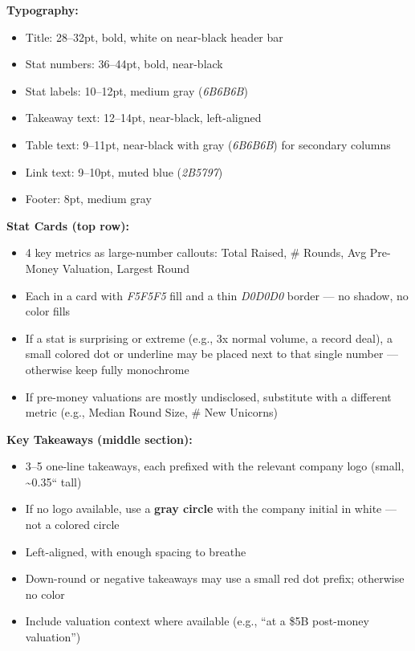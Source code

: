 \documentclass[11pt]{article}
\begin{document}
\textbf{Typography:}

\begin{itemize}[leftmargin=*,itemsep=2pt,topsep=2pt]
\item {} Title: 28–32pt, bold, white on near-black header bar
\item {} Stat numbers: 36–44pt, bold, near-black
\item {} Stat labels: 10–12pt, medium gray (\emph{6B6B6B})
\item {} Takeaway text: 12–14pt, near-black, left-aligned
\item {} Table text: 9–11pt, near-black with gray (\emph{6B6B6B}) for secondary columns
\item {} Link text: 9–10pt, muted blue (\emph{2B5797})
\item {} Footer: 8pt, medium gray
\end{itemize}

\textbf{Stat Cards (top row):}

\begin{itemize}[leftmargin=*,itemsep=2pt,topsep=2pt]
\item {} 4 key metrics as large-number callouts: Total Raised, \# Rounds, Avg Pre-Money Valuation, Largest Round
\item {} Each in a card with \emph{F5F5F5} fill and a thin \emph{D0D0D0} border — no shadow, no color fills
\item {} If a stat is surprising or extreme (e.g., 3x normal volume, a record deal), a small colored dot or underline may be placed next to that single number — otherwise keep fully monochrome
\item {} If pre-money valuations are mostly undisclosed, substitute with a different metric (e.g., Median Round Size, \# New Unicorns)
\end{itemize}

\textbf{Key Takeaways (middle section):}

\begin{itemize}[leftmargin=*,itemsep=2pt,topsep=2pt]
\item {} 3–5 one-line takeaways, each prefixed with the relevant company logo (small, \textasciitilde{}0.35`` tall)
\item {} If no logo available, use a \textbf{gray circle} with the company initial in white — not a colored circle
\item {} Left-aligned, with enough spacing to breathe
\item {} Down-round or negative takeaways may use a small red dot prefix; otherwise no color
\item {} Include valuation context where available (e.g., ``at a \$5B post-money valuation'')
\end{itemize}
\end{document}
